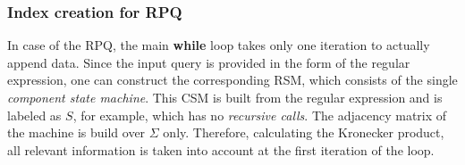
\subsubsection{Index creation for RPQ}
In case of the RPQ, the main \textbf{while} loop takes only one iteration to actually append data.
Since the input query is provided in the form of the regular expression, one can construct the corresponding RSM, which consists of the single \textit{component state machine}.
This CSM is built from the regular expression and is labeled as $S$, for example, which has no \textit{recursive calls}.
The adjacency matrix of the machine is build over $\Sigma$ only.
Therefore, calculating the Kronecker product, all relevant information is taken into account at the first iteration of the loop.